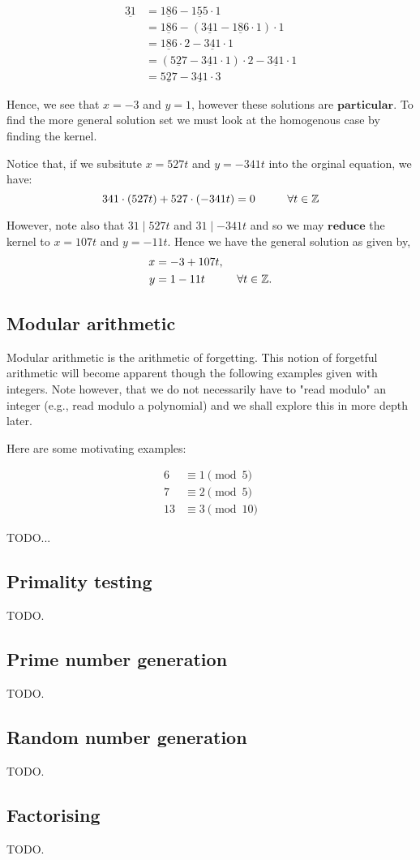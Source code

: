 \begin{align}
 \underline{31} &= \underline{186} - \underline{155} \cdot 1
 \\
 &= \underline{186} - (\underline{341} - \underline{186} \cdot 1) \cdot 1
 \\
 &= \underline{186} \cdot 2 - \underline{341} \cdot 1 \tag{after simplifying}
 \\
 &= (\underline{527} - \underline{341} \cdot 1) \cdot 2 - \underline{341} \cdot 1
 \\
 &= \underline{527} - \underline{341} \cdot 3 \tag{after simplifying}
\end{align}

Hence, we see that $x=-3$ and $y=1$, however these solutions are $\textbf{particular}$.
To find the more general solution set we must look at the homogenous case by finding the kernel.

Notice that, if we subsitute $x=527t$ and $y=-341t$ into the orginal equation, we have:
\[
 341 \cdot (527t) + 527 \cdot (-341t) = 0 \hspace{1cm} \forall t \in \mathbb{Z}
\]

However, note also that $31 \mid 527t$ and $31 \mid -341t$ and so we may $\textbf{reduce}$ the kernel
to $x=107t$ and $y=-11t$. Hence we have the general solution as given by,
\begin{align}
 x &= -3 + 107t, \\
 y &= 1 - 11t \hspace{1cm} \forall t \in \mathbb{Z}.
\end{align}


\subsection{Modular arithmetic}
Modular arithmetic is the arithmetic of forgetting.
This notion of forgetful arithmetic will become apparent though
the following examples given with integers. Note however, that we
do not necessarily have to "read modulo" an integer (e.g., read modulo a polynomial)
and we shall explore this in more depth later.

Here are some motivating examples:
\begin{exmp}
\begin{align}
 6 & \equiv 1 \pmod{5}
 \\
 7 & \equiv 2 \pmod{5}
 \\
 13 & \equiv 3 \pmod{10}
\end{align}
\end{exmp}
TODO...

\subsection{Primality testing}
TODO.

\subsection{Prime number generation}
TODO.

\subsection{Random number generation}
TODO.

\subsection{Factorising}
TODO.
